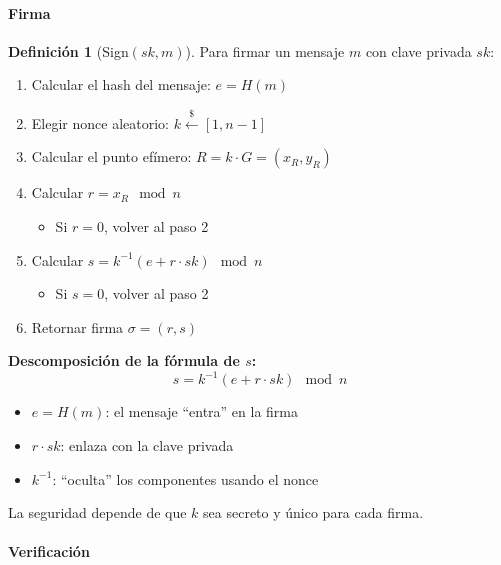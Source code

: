 \documentclass[11pt,a4paper,twoside,openright]{book}
\theoremstyle{definition}
\newtheorem{definition}{Definición}[chapter]
\theoremstyle{plain}
\theoremstyle{remark}
\begin{document}
\paragraph{Firma}

\begin{definition}[Sign$(sk, m)$]
Para firmar un mensaje $m$ con clave privada $sk$:

\begin{enumerate}
    \item Calcular el hash del mensaje: $e = H(m)$
    
    \item Elegir nonce aleatorio: $k \xleftarrow{\$} [1, n-1]$
    
    \item Calcular el punto efímero: $R = k \cdot G = (x_R, y_R)$
    
    \item Calcular $r = x_R \mod n$
    \begin{itemize}
        \item Si $r = 0$, volver al paso 2
    \end{itemize}
    
    \item Calcular $s = k^{-1}(e + r \cdot sk) \mod n$
    \begin{itemize}
        \item Si $s = 0$, volver al paso 2
    \end{itemize}
    
    \item Retornar firma $\sigma = (r, s)$
\end{enumerate}
\end{definition}

\begin{mathnote}
\textbf{Descomposición de la fórmula de $s$:}
\[ s = k^{-1}(e + r \cdot sk) \mod n \]

\begin{itemize}
    \item $e = H(m)$: el mensaje ``entra'' en la firma
    \item $r \cdot sk$: enlaza con la clave privada
    \item $k^{-1}$: ``oculta'' los componentes usando el nonce
\end{itemize}

La seguridad depende de que $k$ sea secreto y único para cada firma.
\end{mathnote}

\paragraph{Verificación}
\end{document}

